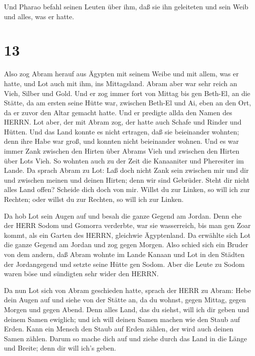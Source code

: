  Und Pharao befahl seinen Leuten über ihm, daß sie ihn
geleiteten und sein Weib und alles, was er hatte.

\hypertarget{section-12}{%
\section{13}\label{section-12}}

 Also zog Abram herauf aus Ägypten mit seinem Weibe und mit
allem, was er hatte, und Lot auch mit ihm, ins Mittagsland. 
Abram aber war sehr reich an Vieh, Silber und Gold.  Und er
zog immer fort von Mittag bis gen Beth-El, an die Stätte, da am ersten
seine Hütte war, zwischen Beth-El und Ai,  eben an den Ort,
da er zuvor den Altar gemacht hatte. Und er predigte allda den Namen des
HERRN.  Lot aber, der mit Abram zog, der hatte auch Schafe
und Rinder und Hütten.  Und das Land konnte es nicht
ertragen, daß sie beieinander wohnten; denn ihre Habe war groß, und
konnten nicht beieinander wohnen.  Und es war immer Zank
zwischen den Hirten über Abrams Vieh und zwischen den Hirten über Lots
Vieh. So wohnten auch zu der Zeit die Kanaaniter und Pheresiter im
Lande.  Da sprach Abram zu Lot: Laß doch nicht Zank sein
zwischen mir und dir und zwischen meinen und deinen Hirten; denn wir
sind Gebrüder.  Steht dir nicht alles Land offen? Scheide
dich doch von mir. Willst du zur Linken, so will ich zur Rechten; oder
willst du zur Rechten, so will ich zur Linken.

 Da hob Lot sein Augen auf und besah die ganze Gegend am
Jordan. Denn ehe der HERR Sodom und Gomorra verderbte, war sie
wasserreich, bis man gen Zoar kommt, als ein Garten des HERRN, gleichwie
Ägyptenland.  Da erwählte sich Lot die ganze Gegend am
Jordan und zog gegen Morgen. Also schied sich ein Bruder von dem andern,
 daß Abram wohnte im Lande Kanaan und Lot in den Städten
der Jordangegend und setzte seine Hütte gen Sodom.  Aber
die Leute zu Sodom waren böse und sündigten sehr wider den HERRN.

 Da nun Lot sich von Abram geschieden hatte, sprach der
HERR zu Abram: Hebe dein Augen auf und siehe von der Stätte an, da du
wohnst, gegen Mittag, gegen Morgen und gegen Abend.  Denn
alles Land, das du siehst, will ich dir geben und deinem Samen ewiglich;
 und ich will deinen Samen machen wie den Staub auf Erden.
Kann ein Mensch den Staub auf Erden zählen, der wird auch deinen Samen
zählen.  Darum so mache dich auf und ziehe durch das Land
in die Länge und Breite; denn dir will ich's geben.

